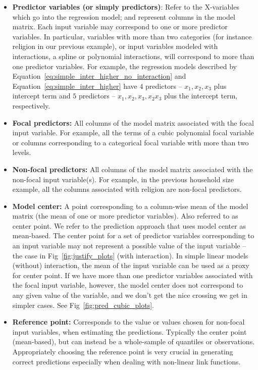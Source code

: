 \begin{itemize}
\item \textbf{Predictor variables (or simply predictors)}: Refer to the X-variables which go into the regression model; and represent columns in the model matrix. Each input variable may correspond to one or more predictor variables. In particular, variables with more than two categories (for instance religion in our previous example), or input variables modeled with interactions, a spline or polynomial interactions, will correspond to more than one predictor variables. For example, the regression models described by Equation~\ref{eq:simple_inter_higher_no_interaction} and Equation~\ref{eq:simple_inter_higher} have $4$ predictors -- $x_1, x_2, x_3$ plus intercept term and $5$ predictors -- $x_1, x_2, x_3, x_2x_3$ plus the intercept term, respectively.
\item \textbf{Focal predictors:} All columns of the model matrix associated with the focal input variable. For example, all the terms of a cubic polynomial focal variable or columns corresponding to a categorical focal variable with more than two levels.
\item \textbf{Non-focal predictors:} All columns of the model matrix associated with the non-focal input variable(s). For example, in the previous household size example, all the columns associated with religion are non-focal predictors.
\item \textbf{Model center:} A point corresponding to a column-wise mean of the model matrix (the mean of one or more predictor variables). Also referred to as center point. We refer to the prediction approach that uses model center as mean-based. The center point for a set of predictor variables corresponding to an input variable may not represent a possible value of the input variable -- the case in Fig~\ref{fig:justify_plots} (with interaction). In simple linear models (without) interaction, the mean of the input variable can be used as a proxy for center point. If we have more than one predictor variables associated with the focal input variable, however, the model center does not correspond to any given value of the variable, and we don't get the nice crossing we get in simpler cases. See Fig~\ref{fig:pred_cubic_plots}.
\item \textbf{Reference point:} Corresponds to the value or values chosen for non-focal input variables, when estimating the predictions. Typically the center point (mean-based), but can instead be a whole-sample of quantiles or observations. Appropriately choosing the reference point is very crucial in generating correct predictions especially when dealing with non-linear link functions.

\end{itemize}

